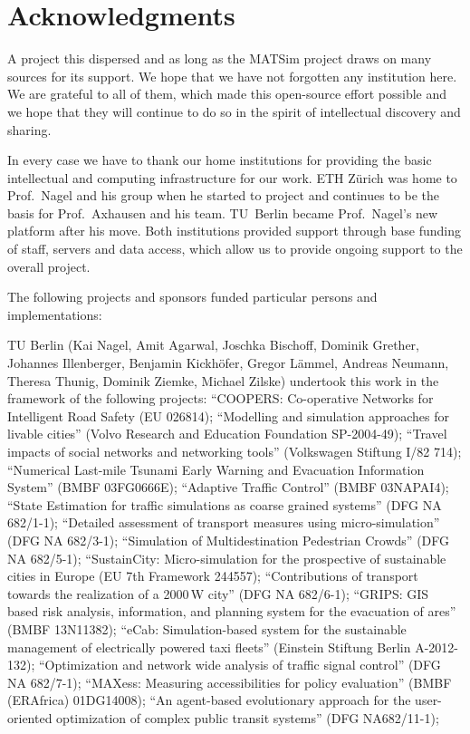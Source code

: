 \chapter*{Acknowledgments}
\label{ch:acks}


A project this dispersed and as long as the MATSim project draws on many sources for its support. We hope that we have not forgotten any institution here. 
We are grateful to all of them, which made this open-source effort possible and we hope that they will continue to do so in the spirit of intellectual discovery and sharing. 

In every case we have to thank our home institutions for providing the basic intellectual and computing infrastructure for our work. 
ETH Zürich was home to Prof.~Nagel and his group when he started to project and continues to be the basis for Prof.~Axhausen and his team. 
TU~Berlin became Prof.~Nagel's new platform after his move. 
Both institutions provided support through base funding of staff, servers and data access, which allow us to provide ongoing support to the overall project. 

The following projects and sponsors funded particular persons and implementations: 

TU Berlin (Kai Nagel, Amit Agarwal, Joschka Bischoff, Dominik Grether, Johannes Illenberger, Benjamin Kickhöfer, Gregor Lämmel, Andreas Neumann, Theresa Thunig, Dominik Ziemke, Michael Zilske) undertook this work in the framework of the following projects: 
%
``COOPERS: Co-operative Networks for Intelligent Road Safety (EU 026814);
``Modelling and simulation approaches for livable cities'' (Volvo Research and Education Foundation SP-2004-49);
``Travel impacts of social networks and networking tools'' (Volkswagen Stiftung I/82 714);
``Numerical Last-mile Tsunami Early Warning and Evacuation Information System'' (BMBF 03FG0666E);
``Adaptive Traffic Control'' (BMBF 03NAPAI4);
``State Estimation for traffic simulations as coarse grained systems'' (DFG NA 682/1-1);
``Detailed assessment of transport measures using micro-simulation'' (DFG NA 682/3-1);
``Simulation of Multidestination Pedestrian Crowds'' (DFG NA 682/5-1);
``SustainCity: Micro-simulation for the prospective of sustainable cities in Europe (EU 7th Framework 244557);
``Contributions of transport towards the realization of a 2000\,W city'' (DFG NA 682/6-1);
``GRIPS: GIS based risk analysis, information, and planning system for the evacuation of ares'' (BMBF 13N11382);
``eCab: Simulation-based system for the sustainable management of electrically powered taxi fleets'' (Einstein Stiftung Berlin A-2012-132);
``Optimization and network wide analysis of traffic signal control'' (DFG NA 682/7-1);
``MAXess: Measuring accessibilities for policy evaluation'' (BMBF (ERAfrica) 01DG14008); %
``An agent-based evolutionary approach for the user-oriented optimization of complex public transit systems'' (DFG NA682/11-1);

